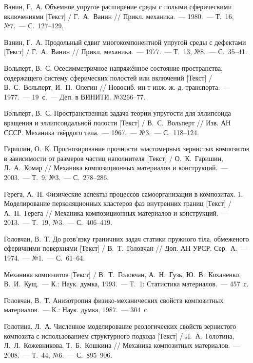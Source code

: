 \begin{biblist}{99}
Ванин, Г.~А. 
Объемное упругое расширение среды с полыми сферическими включениями [Текст] 
/ Г.~А.~Ванин
// Прикл. механика.~--- 1980.~--- Т.~16, №7.~--- С.~127--129.

Ванин, Г.~А. 
Продольный сдвиг многокомпонентной упругой среды с дефектами [Текст] 
/ Г.~А.~Ванин
// Прикл. механика.~--- 1977.~--- Т.~13, №8.~--- С.~35--41.

Вольперт, В.~С. Осесимметричное напряжённое состояние пространства, содержащего систему сферических полостей или включений [Текст] 
/ В.~С.~Вольперт, И.~П.~Олегин 
// Новосиб. ин-т инж. ж.-д. транспорта.~--- 1977.~--- 19~с.~--- Деп. в ВИНИТИ. №3266--77.

Вольперт, В.~С. 
Пространственная задача теории упругости для эллипсоида вращения и эллипсоидальной полости [Текст] 
/ В.~С.~Вольперт 
// Изв. АН СССР. Механика твёрдого тела.~--- 1967.~--- №3.~--- С.~118--124.

Гаришин, О.~К. 
Прогнозирование прочности эластомерных зернистых композитов в зависимости от размеров частиц наполнителя [Текст] 
/ О.~К.~Гаришин, Л.~А.~Комар 
// Механика композиционных материалов и конструкций.~--- 2003.~--- Т.~9, №3.~--- С.~278--286.

Герега, А.~Н. 
Физические аспекты процессов самоорганизации в композитах. 1. Моделирование перколяционных кластеров фаз внутренних границ [Текст] 
/ А.~Н.~Герега 
// Механика композиционных материалов и конструкций.~--- 2013.~--- Т.~19, №3.~--- С.~406--419.

Головчан, В.~Т. 
До розв’язку граничних задач статики пружного тіла, обмеженого сферичними поверхнями [Текст] 
/ В.~Т.~Головчан 
// Доп. АН УРСР. Сер.~А.~--- 1974.~--- №1.~--- С.~61--64.

Механика композитов [Текст] 
/ В.~Т.~Головчан, А.~Н.~Гузь, Ю.~В.~Коханенко, В.~И.~Кущ.~--- К.: Наук. думка, 1993.~--- Т.~1: Статистика материалов.~--- 457~с.

Головчан, В.~Т. 
Анизотропия физико-механических свойств композитных материалов.~--- К.: Наук. думка, 1987.~--- 304~с.

Голотина, Л.~А. 
Численное моделирование реологических свойств зернистого композита с использованием структурного подхода [Текст] 
/ Л.~А.~Голотина, Л.~Л.~Кожевникова, Т.~Б.~Кошкина 
// Механика композитных материалов.~--- 2008.~--- Т.~44, №6.~--- С.~895--906.


\end{biblist}
